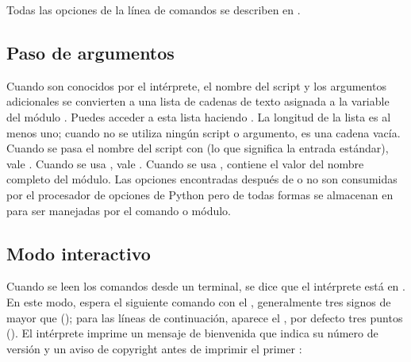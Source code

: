 \documentclass[a5paper,10pt,spanish]{sphinxmanual}
\begin{document}
\sphinxAtStartPar
Todas las opciones de la línea de comandos se describen en .


\subsection{Paso de argumentos}
\label{\detokenize{tutorial/interpreter:argument-passing}}\label{\detokenize{tutorial/interpreter:tut-argpassing}}
\sphinxAtStartPar
Cuando son conocidos por el intérprete, el nombre del script y los argumentos adicionales se convierten a una lista de cadenas de texto asignada a la variable  del módulo . Puedes acceder a esta lista haciendo . La longitud de la lista es al menos uno; cuando no se utiliza ningún script o argumento,  es una cadena vacía. Cuando se pasa el nombre del script con  (lo que significa la entrada estándar),  vale . Cuando se usa  ,  vale . Cuando se usa  ,  contiene el valor del nombre completo del módulo. Las opciones encontradas después de   o   no son consumidas por el procesador de opciones de Python pero de todas formas se almacenan en  para ser manejadas por el comando o módulo.


\subsection{Modo interactivo}
\label{\detokenize{tutorial/interpreter:interactive-mode}}\label{\detokenize{tutorial/interpreter:tut-interactive}}
\sphinxAtStartPar
Cuando se leen los comandos desde un terminal, se dice que el intérprete está en . En este modo, espera el siguiente comando con el , generalmente tres signos de mayor que (\sphinxcode{\sphinxupquote{>>>}}); para las líneas de continuación, aparece el , por defecto tres puntos (). El intérprete imprime un mensaje de bienvenida que indica su número de versión y un aviso de copyright antes de imprimir el primer :
\end{document}
